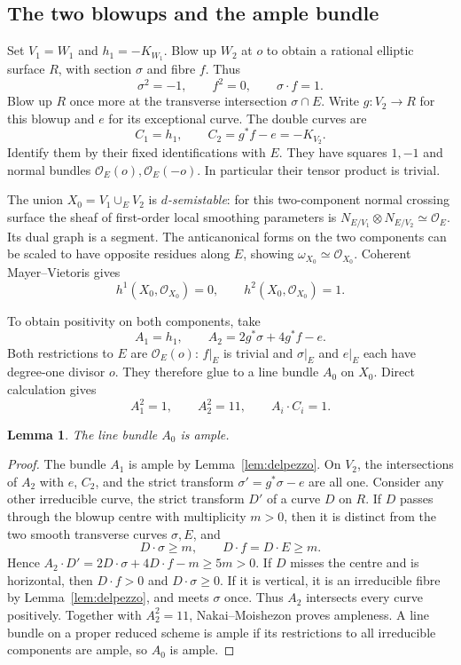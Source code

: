 \documentclass[11pt]{article}
\newtheorem{lemma}[theorem]{Lemma}
\theoremstyle{definition}
\theoremstyle{remark}
\newcommand{\OO}{\mathcal O}
\begin{document}
\subsection{The two blowups and the ample bundle}
Set $V_1=W_1$ and $h_1=-K_{W_1}$. Blow up $W_2$ at $o$ to obtain a rational elliptic surface $R$, with section $\sigma$ and fibre $f$. Thus
\[
\sigma^2=-1,\qquad f^2=0,\qquad \sigma\cdot f=1.
\]
Blow up $R$ once more at the transverse intersection $\sigma\cap E$. Write $g:V_2\to R$ for this blowup and $e$ for its exceptional curve. The double curves are
\[
C_1=h_1,\qquad C_2=g^*f-e=-K_{V_2}.
\]
Identify them by their fixed identifications with $E$. They have squares $1,-1$ and normal bundles $\OO_E(o),\OO_E(-o)$. In particular their tensor product is trivial.

The union $X_0=V_1\cup_E V_2$ is \emph{$d$-semistable}: for this two-component normal crossing surface the sheaf of first-order local smoothing parameters is
$N_{E/V_1}\otimes N_{E/V_2}\simeq\OO_E$. Its dual graph is a segment. The anticanonical forms on the two components can be scaled to have opposite residues along $E$, showing $\omega_{X_0}\simeq\OO_{X_0}$. Coherent Mayer--Vietoris gives
\begin{equation}\label{eq:coherent}
h^1(X_0,\OO_{X_0})=0,\qquad h^2(X_0,\OO_{X_0})=1.
\end{equation}

To obtain positivity on both components, take
\begin{equation}\label{eq:ample-pair}
A_1=h_1,\qquad A_2=2g^*\sigma+4g^*f-e.
\end{equation}
Both restrictions to $E$ are $\OO_E(o)$: $f|_E$ is trivial and $\sigma|_E$ and $e|_E$ each have degree-one divisor $o$. They therefore glue to a line bundle $A_0$ on $X_0$. Direct calculation gives
\begin{equation}\label{eq:squares}
A_1^2=1,\qquad A_2^2=11,\qquad A_i\cdot C_i=1.
\end{equation}

\begin{lemma}\label{lem:ample}
The line bundle $A_0$ is ample.
\end{lemma}
\begin{proof}
The bundle $A_1$ is ample by Lemma~\ref{lem:delpezzo}. On $V_2$, the intersections of $A_2$ with $e$, $C_2$, and the strict transform $\sigma'=g^*\sigma-e$ are all one. Consider any other irreducible curve, the strict transform $D'$ of a curve $D$ on $R$. If $D$ passes through the blowup centre with multiplicity $m>0$, then it is distinct from the two smooth transverse curves $\sigma,E$, and
\[
D\cdot\sigma\geq m,\qquad D\cdot f=D\cdot E\geq m.
\]
Hence $A_2\cdot D'=2D\cdot\sigma+4D\cdot f-m\geq5m>0$. If $D$ misses the centre and is horizontal, then $D\cdot f>0$ and $D\cdot\sigma\geq0$. If it is vertical, it is an irreducible fibre by Lemma~\ref{lem:delpezzo}, and meets $\sigma$ once. Thus $A_2$ intersects every curve positively. Together with $A_2^2=11$, Nakai--Moishezon proves ampleness. A line bundle on a proper reduced scheme is ample if its restrictions to all irreducible components are ample, so $A_0$ is ample.
\end{proof}
\end{document}

